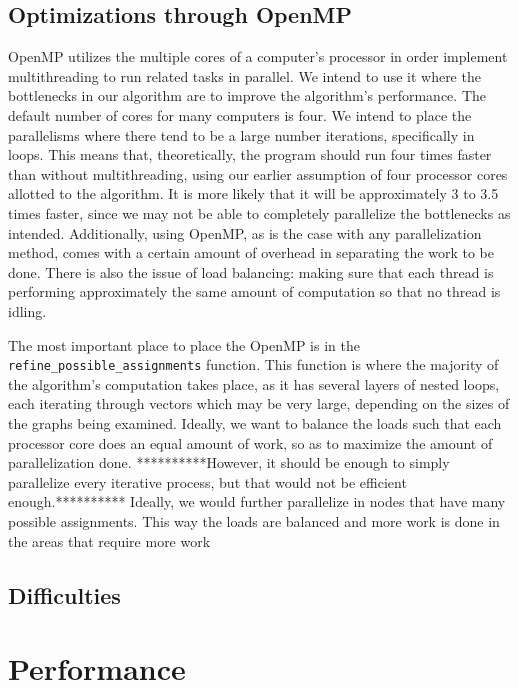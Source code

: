 \documentclass{article}
\begin{document}
  \subsection{Optimizations through OpenMP}
  OpenMP utilizes the multiple cores of a computer's processor in order implement multithreading to run related tasks in parallel. We intend to use it where the bottlenecks in our algorithm are to improve the algorithm's performance. The default number of cores for many computers is four. We intend to place the parallelisms where there tend to be a large number iterations, specifically in loops. This means that, theoretically, the program should run four times faster than without multithreading, using our earlier assumption of four processor cores allotted to the algorithm. It is more likely that it will be approximately 3 to 3.5 times faster, since we may not be able to completely parallelize the bottlenecks as intended. Additionally, using OpenMP, as is the case with any parallelization method, comes with a certain amount of overhead in separating the work to be done. There is also the issue of load balancing: making sure that each thread is performing approximately the same amount of computation so that no thread is idling. 
  
  The most important place to place the OpenMP is in the \texttt{refine\_possible\_assignments} function. This function is where the majority of the algorithm's computation takes place, as it has several layers of nested loops, each iterating through vectors which may be very large, depending on the sizes of the graphs being examined. Ideally, we want to balance the loads such that each processor core does an equal amount of work, so as to maximize the amount of parallelization done. **********However, it should be enough to simply parallelize every iterative process, but that would not be efficient enough.********** Ideally, we would further parallelize in nodes that have many possible assignments. This way the loads are balanced and more work is done in the areas that require more work

  \subsection{Difficulties}

\section{Performance}
\end{document}
